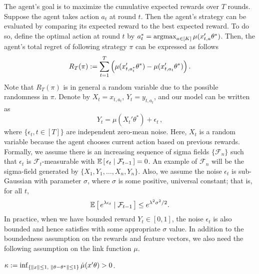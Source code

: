The agent's goal is to maximize the cumulative expected rewards over $T$ rounds. Suppose the agent takes action $a_t$ at round $t$. Then the agent's strategy can be evaluated by comparing its expected reward to the best expected reward. To do so, define the optimal action at round $t$ by $a_t^*=\mathop{\rm argmax}_{a \in [K]} \mu(x_{t,a}'\theta^*)$. Then, the agent's total regret of following strategy $\pi$ can be expressed as follows
\vspace{-1mm}
\begin{equation*}
R_T(\pi) := \sum_{t=1}^{T} \left( \mu(x_{t,a_t^*}'\theta^*) - \mu(x_{t,a_t}'\theta^*) \right).
\end{equation*}
Note that $R_T(\pi)$ is in general a random variable due to the possible randomness in $\pi$. Denote by $X_{t}=x_{t,a_t}$, $Y_{t}=y_{t,a_t}$, and our model can be written as 
\begin{equation} \label{eq:model1}
Y_{t} = \mu(X_t'\theta^*) + \epsilon_t\,,
\end{equation}
where $\{\epsilon_t, t \in [T]\}$ are independent zero-mean noise. Here, $X_t$ is a random variable because the agent chooses current action based on previous rewards. Formally, we assume there is an increasing sequence of sigma fields $\{\mathcal{F}_{n}\}$ such that 
$\epsilon_t$ is $\mathcal{F}_{t}$-measurable with $\mathbb{E} \left[\,\epsilon_t \mid \mathcal{F}_{t-1}\,\right]=0$.  An example of $\mathcal{F}_{n}$ will be the sigma-field generated by $\{X_1,Y_1,\ldots,X_n, Y_n\}$. Also, we assume the noise $\epsilon_t$ is sub-Gaussian with parameter $\sigma$, where $\sigma$ is some positive, universal constant; that is, for all $t$,
\begin{equation} \label{eq:glm2}
\mathbb{E} \left [\, e^{\lambda \epsilon_t} \mid \mathcal{F}_{t-1}\,\right] \le e^{\lambda^2 \sigma^2/2}.
\end{equation}
In practice, when we have bounded reward $Y_t \in [0,1]$,
the noise $\epsilon_t$ is also bounded and hence satisfies  with some appropriate $\sigma$ value. In addition to the boundedness assumption on the rewards and feature vectors, we also need the following assumption on the link function $\mu$. 

\begin{assumption} \label{ass:kappa}
$\kappa := \inf_{\{\left\|x\right\|\le 1,\,\,\left\|\theta-\theta^*\right\| \le 1\}} \dot{\mu}(x'\theta)  > 0 $.
\end{assumption}


